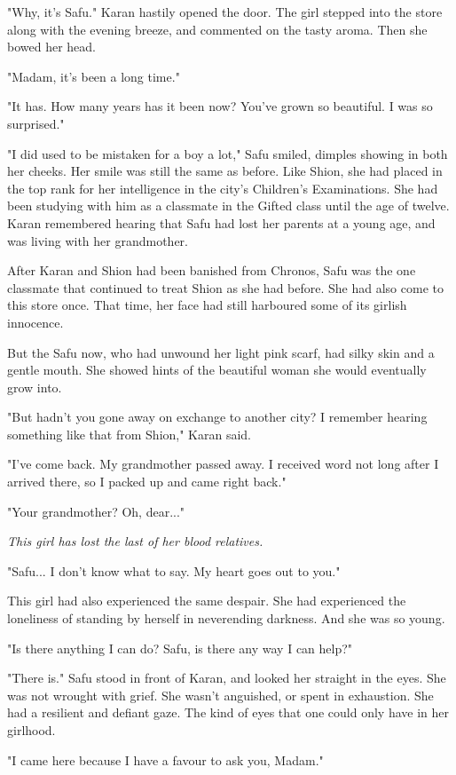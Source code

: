 "Why, it's Safu." Karan hastily opened the door. The girl stepped into
the store along with the evening breeze, and commented on the tasty
aroma. Then she bowed her head.

"Madam, it's been a long time."

"It has. How many years has it been now? You've grown so beautiful. I
was so surprised."

"I did used to be mistaken for a boy a lot," Safu smiled, dimples
showing in both her cheeks. Her smile was still the same as before. Like
Shion, she had placed in the top rank for her intelligence in the city's
Children's Examinations. She had been studying with him as a classmate
in the Gifted class until the age of twelve. Karan remembered hearing
that Safu had lost her parents at a young age, and was living with her
grandmother.

After Karan and Shion had been banished from Chronos, Safu was the one
classmate that continued to treat Shion as she had before. She had also
come to this store once. That time, her face had still harboured some of
its girlish innocence.

But the Safu now, who had unwound her light pink scarf, had silky skin
and a gentle mouth. She showed hints of the beautiful woman she would
eventually grow into.

"But hadn't you gone away on exchange to another city? I remember
hearing something like that from Shion," Karan said.

"I've come back. My grandmother passed away. I received word not long
after I arrived there, so I packed up and came right back."

"Your grandmother? Oh, dear..."

\emph{This girl has lost the last of her blood relatives.}

"Safu... I don't know what to say. My heart goes out to you."

This girl had also experienced the same despair. She had experienced the
loneliness of standing by herself in neverending darkness. And she was
so young.

"Is there anything I can do? Safu, is there any way I can help?"

"There is." Safu stood in front of Karan, and looked her straight in the
eyes. She was not wrought with grief. She wasn't anguished, or spent in
exhaustion. She had a resilient and defiant gaze. The kind of eyes that
one could only have in her girlhood.

"I came here because I have a favour to ask you, Madam."

